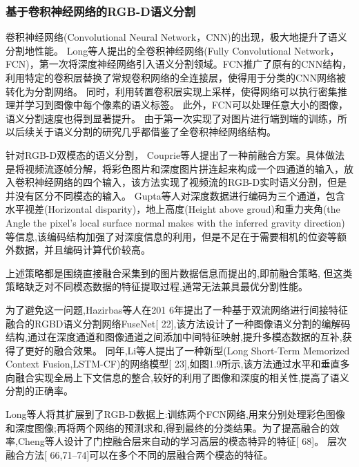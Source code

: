 \subsubsection{基于卷积神经网络的RGB-D语义分割}
卷积神经网络(Convolutional Neural Network，CNN)的出现，极大地提升了语义分割地性能。
Long等人\cite{Long15CVPR}提出的全卷积神经网络(Fully Convolutional Network，FCN)，第一次将深度神经网络引入语义分割领域。FCN推广了原有的CNN结构，利用特定的卷积层替换了常规卷积网络的全连接层，使得用于分类的CNN网络被转化为分割网络。
同时，利用转置卷积层实现上采样，使得网络可以执行密集推理并学习到图像中每个像素的语义标签。
此外，FCN可以处理任意大小的图像，语义分割速度也得到显著提升。
由于第一次实现了对图片进行端到端的训练，所以后续关于语义分割的研究几乎都借鉴了全卷积神经网络结构。

针对RGB-D双模态的语义分割， Couprie等人\cite{Couprie14MLR}提出了一种前融合方案。具体做法是将视频流逐帧分解，将彩色图片和深度图片拼连起来构成一个四通道的输入，放入卷积神经网络的四个输入，该方法实现了视频流的RGB-D实时语义分割，但是并没有区分不同模态的输入。
Gupta等人\cite{Gupta14ECCV}对深度数据进行编码为三个通道，包含水平视差(Horizontal disparity)，地上高度(Height above groud)和重力夹角(the Angle the pixel’s local surface normal makes with the inferred gravity
direction)等信息,该编码结构加强了对深度信息的利用，但是不足在于需要相机的位姿等额外数据，并且编码计算代价较高。


















\iffalse 
上述策略都是围绕直接融合采集到的图片数据信息而提出的,即前融合策略, 但这类策略缺乏对不同模态数据的特征提取过程,通常无法兼具最优分割性能。

为了避免这一问题,Hazirbas等人在201 6年提出了一种基于双流网络进行间接特征融合的RGBD语义分割网络FuseNet[ 22],该方法设计了一种图像语义分割的编解码结构,通过在深度通道和图像通道之间添加中间特征映射,提升多模态数据的互补,获得了更好的融合效果。
同年,Li等人提出了一种新型(Long Short-Term Memorized Context Fusion,LSTM-CF)的网络模型[ 23],如图1.9所示,该方法通过水平和垂直多向融合实现全局上下文信息的整合,较好的利用了图像和深度的相关性,提高了语义分割的正确率。 


Long等人将其扩展到了RGB-D数据上:训练两个FCN网络,用来分别处理彩色图像和深度图像;再将两个网络的预测求和,得到最终的分类结果。为了提高融合的效率,Cheng等人设计了门控融合层来自动的学习高层的模态特异的特征[ 68]。
层次融合方法[ 66,71–74]可以在多个不同的层融合两个模态的特征。


